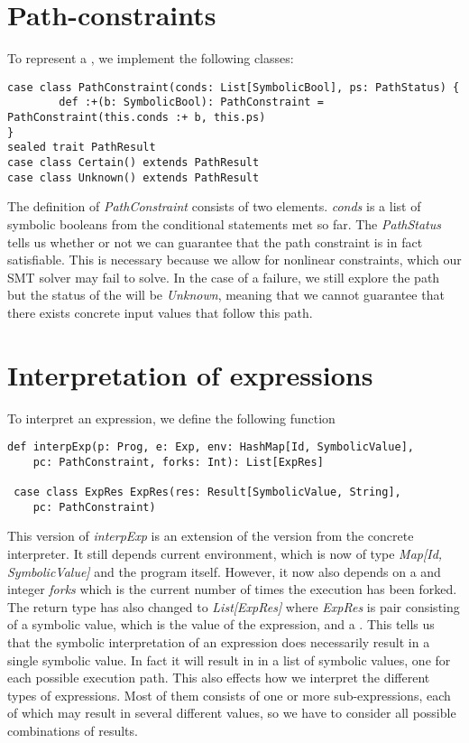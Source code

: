 \section{Path-constraints}
To represent a \pc, we implement the following classes:

\begin{lstlisting}[style=simple]
case class PathConstraint(conds: List[SymbolicBool], ps: PathStatus) {
		def :+(b: SymbolicBool): PathConstraint = PathConstraint(this.conds :+ b, this.ps)
}
sealed trait PathResult
case class Certain() extends PathResult
case class Unknown() extends PathResult
\end{lstlisting}

The definition of \textsl{PathConstraint} consists of two elements. \textsl{conds} is a  list of symbolic booleans from the conditional statements met so far. The \textsl{PathStatus} tells us whether or not we can guarantee that the path constraint is in fact satisfiable. This is necessary because we allow for nonlinear constraints, which our SMT solver may fail to solve. In the case of a failure, we still explore the path but the status of the \pc will be \textsl{Unknown}, meaning that we cannot guarantee that there exists concrete input values that follow this path.

\section{Interpretation of expressions}
To interpret an expression, we define the following function

\begin{lstlisting}[style = simple]
 def interpExp(p: Prog, e: Exp, env: HashMap[Id, SymbolicValue], 
 	pc: PathConstraint, forks: Int): List[ExpRes]
  
 case class ExpRes ExpRes(res: Result[SymbolicValue, String], 
 	pc: PathConstraint)
\end{lstlisting}

This version of \textsl{interpExp} is an extension of the version from the concrete interpreter. It still depends current environment, which is now of type \textsl{Map[Id, SymbolicValue]} and the program itself. However, it now also depends on a \pc and integer \textsl{forks} which is the current number of times the execution has been forked. The return type has also changed to \textsl{List[ExpRes]} where \textsl{ExpRes} is pair consisting of a symbolic value, which is the value of the expression, and a \pc. This tells us that the symbolic interpretation of an expression does necessarily result in a single symbolic value. In fact it will result in in a list of symbolic values, one for each possible execution path. This also effects how we interpret the different types of expressions. Most of them consists of one or more sub-expressions, each of which may result in several different values, so we have to consider all possible combinations of results.  

